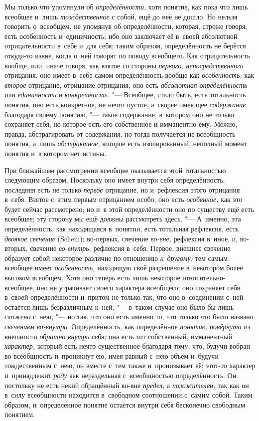 Мы только что упомянули об {\em определённости,} хотя понятие, как пока что
лишь всеобщее и~лишь {\em тождественное} с
собой, ещё до неё не дошло. Но нельзя говорить о~всеобщем, не упомянув об
определённости, которая, строже говоря, есть особенность и~единичность; ибо
оно заключает её в~своей абсолютной отрицательности в~себе и~для себя;
таким образом, определённость не берётся откуда-то извне, когда о~ней
говорят по поводу всеобщего. Как отрицательность вообще, или, иначе говоря,
как взятое со стороны {\em первого, непосредственного} отрицания, оно
имеет в~себе самом определённость вообще как {\em особенность;} как
{\em второе} отрицание, отрицание отрицания, оно есть {\em абсолютная
определённость} или {\em единичность} и {\em конкретность}. "--- Всеобщее,
стало быть, есть тотальность понятия, оно есть
конкретное, не нечто пустое, а~скорее имеющее {\em содержание}
благодаря своему понятию, "--- такое содержание,
в~котором оно не только сохраняет себя, но которое есть его собственное и
имманентно ему. Можно, правда, абстрагировать от содержания, но тогда
получается не всеобщность понятия, а~лишь {\em абстрактное,}
которое есть изолированный, неполный момент понятия и~в котором нет истины.

При ближайшем рассмотрении всеобщее оказывается этой
тотальностью следующим образом. Поскольку оно имеет внутри себя
определённость, последняя есть не только {\em первое} отрицание,
но и~рефлексия этого отрицания в~себя. Взятое с~этим первым отрицанием
особо, оно есть {\em особенное,}
как это будет сейчас рассмотрено; но и~в этой определённости
оно по существу ещё есть всеобщее; эту сторону мы ещё должны рассмотреть
здесь. "--- \label{bkm:bm23a}А~именно, эта определённость, как
находящаяся в~понятии, есть тотальная рефлексия, есть {\em двоякое свечение}
(Schein): во-первых, свечение {\em во-вне,} рефлексия в~иное, и, во-вторых,
свечение {\em во-внутрь,} рефлексия в~себя. Первое, внешнее свечение образует
собой некоторое различие по отношению {\em к~другому;} тем самым всеобщее имеет
{\em особенность,} находящую своё разрешение в~некотором более высоком
всеобщем. Хотя оно теперь есть лишь некоторое относительно-всеобщее, оно не
утрачивает своего характера всеобщего; оно сохраняет себя в~своей
определённости и~притом не только так, что оно в~соединении с~ней остаётся
лишь безразличным к~ней, "--- в~таком случае оно было бы лишь {\em сложено}
с~нею, "--- но так, что оно есть именно то, что только что было названо
{\em свечением во-внутрь}. Определённость, как определённое {\em понятие,}
{\em повёрнута} из внешности {\em обратно внутрь себя;} она есть тот
собственный, имманентный {\em характер,} который есть нечто существенное
благодаря тому, что, будучи вобран во всеобщность и~проникнут ею, имея равный
с~нею объём и~будучи тождественным с~нею, он вместе с~тем также и~пронизывает
её; этот-то характер и~принадлежит {\em роду} как нераздельная с~всеобщностью
определённость. Он постольку не есть некий обращённый во-вне {\em предел,}
а {\em положителен,} так как он в~силу всеобщности находится в~свободном
соотношении с~самим собой. Таким образом, и~определённое понятие остаётся
внутри себя бесконечно свободным понятием.

